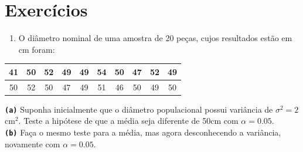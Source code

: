 \documentclass[
]{book}
\providecommand{\tightlist}{%
  \setlength{\itemsep}{0pt}\setlength{\parskip}{0pt}}
\theoremstyle{definition}
\theoremstyle{definition}
\theoremstyle{definition}
\theoremstyle{remark}
\begin{document}
\hypertarget{exercuxedcios}{%
\section{Exercícios}\label{exercuxedcios}}

\begin{enumerate}
\def\labelenumi{\arabic{enumi}.}
\tightlist
\item
  O diâmetro nominal de uma amostra de 20 peças, cujos resultados estão em cm foram:
\end{enumerate}

\begin{longtable}[]{@{}cccccccccc@{}}
\toprule
41 & 50 & 52 & 49 & 49 & 54 & 50 & 47 & 52 & 49\tabularnewline
\midrule
\endhead
50 & 52 & 50 & 47 & 49 & 51 & 46 & 50 & 49 & 50\tabularnewline
\bottomrule
\end{longtable}

\textbf{\texttt{(a)}} Suponha inicialmente que o diâmetro populacional possui variância de \(\sigma^2=2\) cm\(^2\). Teste a hipótese de que a média seja diferente de 50cm com \(\alpha=0.05\).\\
\textbf{\texttt{(b)}} Faça o mesmo teste para a média, mas agora desconhecendo a variância, novamente com \(\alpha=0.05\).
\end{document}
